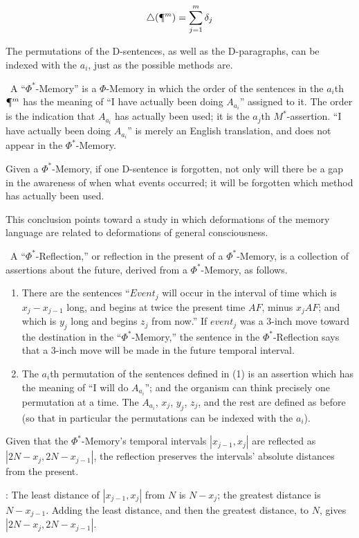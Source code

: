 $$ \triangle(\mathparagraph^m)=\sum_{j=1}^{m} \delta_j $$

The permutations of the D-sentences, as well as the D-paragraphs, can be 
indexed with the $a_i$, just as the possible methods are. 

\begin{hangers}
\ A \enquote{$\Phi^*$-Memory} is a $\Phi$-Memory in which the order of the 
sentences in the $a_i$th $\mathparagraph^m$ has the meaning of \enquote{I have actually been doing $A_{a_i}$}
assigned to it. The order is the indication that $A_{a_i}$ has actually been used; it 
is the $a_j$th $M^*$-assertion. \enquote{I have actually been doing $A_{a_i}$} is merely an English 
translation, and does not appear in the $\Phi^*$-Memory. 

 Given a $\Phi^*$-Memory, if one D-sentence is forgotten, not 
only will there be a gap in the awareness of when what events occurred; it 
will be forgotten which method has actually been used. 
\end{hangers}

This conclusion points toward a study in which deformations of the 
memory language are related to deformations of general consciousness. 

\begin{hangers}
\ A \enquote{$\Phi^*$-Reflection,} or reflection in the present of a 
$\Phi^*$-Memory, is a collection of assertions about the future, derived from a 
$\Phi^*$-Memory, as follows. 
\begin{enumerate}
	\item There are the sentences \enquote{$Event_j$ will occur in the 
interval of time which is $x_j-x_{j-1}$ long, and begins at twice the present time 
$AF$, minus $x_j AF$; and which is $y_j$ long and begins $z_j$ from now.} If $event_j$ was 
		a 3-inch move toward the destination in the \enquote{$\Phi^*$-Memory,} the sentence in the 
$\Phi^*$-Reflection says that a 3-inch move will be made in the future temporal 
interval. 
	\item The $a_i$th permutation of the sentences defined in (1) is an 
assertion which has the meaning of \enquote{I will do $A_{a_i}$}; and the organism can 
think precisely one permutation at a time. The $A_{a_i}$, $x_j$, $y_j$, $z_j$, and the rest are 
defined as before (so that in particular the permutations can be indexed with 
the $a_i$). 
\end{enumerate}
\end{hangers}
\begin{hangers}
 Given that the $\Phi^*$-Memory's temporal intervals $|x_{j-1}, x_j|$
are reflected as $|2N-x_j, 2N-x_{j-1}|$, the reflection preserves the intervals' 
absolute distances from the present. 

\proof: The least distance of $|x_{j-1}, x_j|$
from $N$ is $N-x_j$; the greatest distance is $N-x_{j-1}$. Adding the least distance, and 
then the greatest distance, to $N$, gives $|2N-x_j, 2N-x_{j-1}|$.
\end{hangers}

